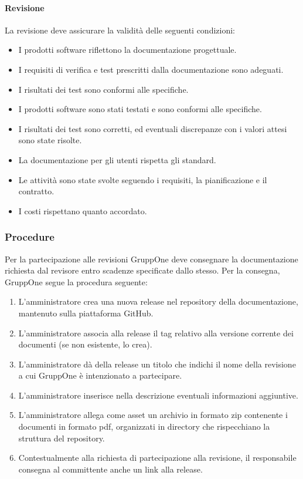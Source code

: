 \documentclass[../../norme-di-progetto.tex]{subfiles}
\begin{document}
\paragraph{Revisione}%
\label{par:revisione}
La revisione deve assicurare la validità delle seguenti condizioni:

\begin{itemize}
  \item I prodotti software riflettono la documentazione progettuale.
  \item I requisiti di verifica e test prescritti dalla documentazione sono adeguati.
  \item I risultati dei test sono conformi alle specifiche.
  \item I prodotti software sono stati testati e sono conformi alle specifiche.
  \item I risultati dei test sono corretti, ed eventuali discrepanze con i valori attesi sono state risolte.
  \item La documentazione per gli utenti rispetta gli standard.
  \item Le attività sono state svolte seguendo i requisiti, la pianificazione e il contratto.
  \item I costi rispettano quanto accordato.
\end{itemize}


\subsubsection{Procedure}%
\label{subs:revisione/procedure}

Per la partecipazione alle revisioni GruppOne deve consegnare la documentazione richiesta dal revisore entro scadenze specificate dallo stesso. Per la consegna, GruppOne segue la procedura seguente:

\begin{enumerate}
  \item L'amministratore crea una nuova release nel repository della documentazione, mantenuto sulla piattaforma GitHub.
  \item L'amministratore associa alla release il tag relativo alla versione corrente dei documenti (se non esistente, lo crea).
  \item L'amministratore dà della release un titolo che indichi il nome della revisione a cui GruppOne è intenzionato a partecipare.
  \item L'amministratore inserisce nella descrizione eventuali informazioni aggiuntive.
  \item L'amministratore allega come asset un archivio in formato zip contenente i documenti in formato pdf, organizzati in directory che rispecchiano la struttura del repository.
  \item Contestualmente alla richiesta di partecipazione alla revisione, il responsabile consegna al committente anche un link alla release.
\end{enumerate}

\end{document}
